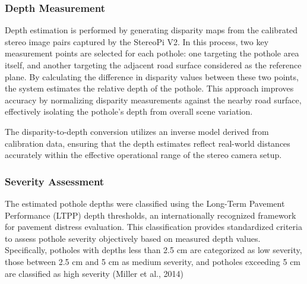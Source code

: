\subsubsection{Depth Measurement}
Depth estimation is performed by generating disparity maps from the calibrated stereo image pairs captured by the StereoPi V2. In this process, two key measurement points are selected for each pothole: one targeting the pothole area itself, and another targeting the adjacent road surface considered as the reference plane. By calculating the difference in disparity values between these two points, the system estimates the relative depth of the pothole. This approach improves accuracy by normalizing disparity measurements against the nearby road surface, effectively isolating the pothole’s depth from overall scene variation.

The disparity-to-depth conversion utilizes an inverse model derived from calibration data, ensuring that the depth estimates reflect real-world distances accurately within the effective operational range of the stereo camera setup.

\subsubsection{Severity Assessment}

The estimated pothole depths were classified using the Long-Term Pavement Performance (LTPP) depth thresholds, an internationally recognized framework for pavement distress evaluation. This classification provides standardized criteria to assess pothole severity objectively based on measured depth values. Specifically, potholes with depths less than 2.5 cm are categorized as low severity, those between 2.5 cm and 5 cm as medium severity, and potholes exceeding 5 cm are classified as high severity (Miller et al., 2014)



